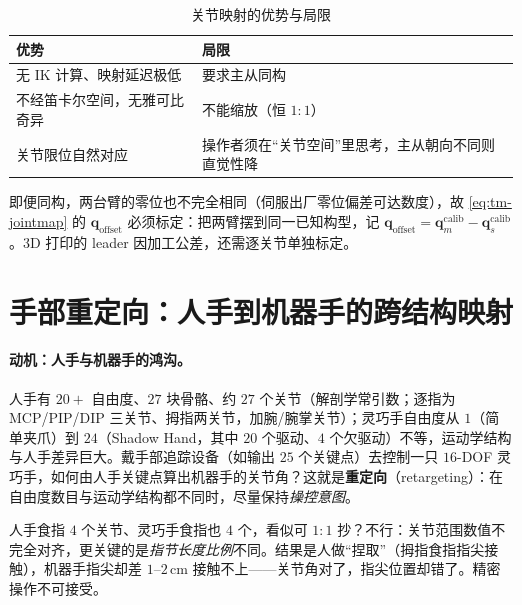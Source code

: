 \begin{table}[H]\centering\small
\caption{关节映射的优势与局限}
\label{tab:tm-joint}
\begin{tabular}{ll}
\toprule
优势 & 局限 \\
\midrule
无 IK 计算、映射延迟极低 & 要求主从同构 \\
不经笛卡尔空间，无雅可比奇异 & 不能缩放（恒 $1{:}1$） \\
关节限位自然对应 & 操作者须在“关节空间”里思考，主从朝向不同则直觉性降 \\
\bottomrule
\end{tabular}
\end{table}

\begin{note}
即便同构，两台臂的零位也不完全相同（伺服出厂零位偏差可达数度），故 \cref{eq:tm-jointmap} 的 $\mathbf{q}_{\text{offset}}$ 必须标定：把两臂摆到同一已知构型，记 $\mathbf{q}_{\text{offset}}=\mathbf{q}_m^{\text{calib}}-\mathbf{q}_s^{\text{calib}}$。$3$D 打印的 leader 因加工公差，还需逐关节单独标定。
\end{note}

\section{手部重定向：人手到机器手的跨结构映射}
\label{sec:tm-retarget}

\paragraph{动机：人手与机器手的鸿沟。}
人手有 $20{+}$ 自由度、$27$ 块骨骼、约 $27$ 个关节（解剖学常引数；逐指为 MCP/PIP/DIP 三关节、拇指两关节，加腕/腕掌关节）；灵巧手自由度从 $1$（简单夹爪）到 $24$（Shadow Hand，其中 $20$ 个驱动、$4$ 个欠驱动）不等，运动学结构与人手差异巨大。戴手部追踪设备（如输出 $25$ 个关键点）去控制一只 $16$-DOF 灵巧手，如何由人手关键点算出机器手的关节角？这就是\textbf{重定向}（retargeting）：在自由度数目与运动学结构都不同时，尽量保持\emph{操控意图}。

\begin{pitfall}[陷阱：人手关节角直接抄给机器手]
人手食指 $4$ 个关节、灵巧手食指也 $4$ 个，看似可 $1{:}1$ 抄？不行：关节范围数值不完全对齐，更关键的是\emph{指节长度比例}不同。结果是人做“捏取”（拇指食指指尖接触），机器手指尖却差 $1$--$2\,$cm 接触不上——关节角对了，指尖位置却错了。精密操作不可接受。
\end{pitfall}

